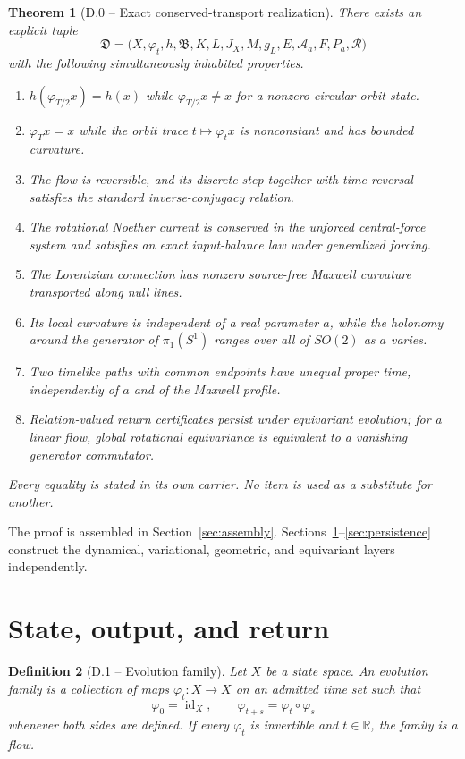 \documentclass[11pt,letterpaper]{article}
\theoremstyle{dynamicsstyle}
\newtheorem{theorem}{Theorem}[section]
\newtheorem{definition}[theorem]{Definition}
\newcommand{\R}{\mathbb{R}}
\newcommand{\id}{\operatorname{id}}
\newcommand{\Flow}{\varphi}
\begin{document}
\begin{theorem}[D.0 -- Exact conserved-transport realization]\label{thm:main}
There exists an explicit tuple
\[
\mathfrak D=
\bigl(
X,\Flow_t,h,\mathfrak B,K,L,J_X,
M,g_L,E,\mathcal A_a,F,P_a,\mathcal R
\bigr)
\]
with the following simultaneously inhabited properties.
\begin{enumerate}
  \item $h(\Flow_{T/2}x)=h(x)$ while $\Flow_{T/2}x\ne x$ for a nonzero circular-orbit state.
  \item $\Flow_Tx=x$ while the orbit trace $t\mapsto\Flow_tx$ is nonconstant and has bounded curvature.
  \item The flow is reversible, and its discrete step together with time reversal satisfies the standard inverse-conjugacy relation.
  \item The rotational Noether current is conserved in the unforced central-force system and satisfies an exact input-balance law under generalized forcing.
  \item The Lorentzian connection has nonzero source-free Maxwell curvature transported along null lines.
  \item Its local curvature is independent of a real parameter $a$, while the holonomy around the generator of $\pi_1(S^1)$ ranges over all of $SO(2)$ as $a$ varies.
  \item Two timelike paths with common endpoints have unequal proper time, independently of $a$ and of the Maxwell profile.
  \item Relation-valued return certificates persist under equivariant evolution; for a linear flow, global rotational equivariance is equivalent to a vanishing generator commutator.
\end{enumerate}
Every equality is stated in its own carrier.  No item is used as a substitute for another.
\end{theorem}

The proof is assembled in Section~\ref{sec:assembly}.  Sections~\ref{sec:return}--\ref{sec:persistence} construct the dynamical, variational, geometric, and equivariant layers independently.

\section{State, output, and return}\label{sec:return}

\begin{definition}[D.1 -- Evolution family]
Let $X$ be a state space.  An evolution family is a collection of maps $\Flow_t:X\to X$ on an admitted time set such that
\[
\Flow_0=\id_X,
\qquad
\Flow_{t+s}=\Flow_t\circ\Flow_s
\]
whenever both sides are defined.  If every $\Flow_t$ is invertible and $t\in\R$, the family is a flow.
\end{definition}
\end{document}

